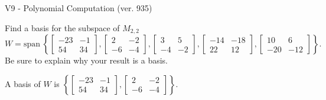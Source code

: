 \begin{exercise}
  \begin{exerciseTitle}V9 - Polynomial Computation (ver. 935)\end{exerciseTitle}
  \begin{exerciseStatement}
    Find a basis for the subspace of \(M_{2,2}\) 
\[W=\mathrm{span}\ \left\{\left[\begin{array}{cc}
-23 & -1 \\
54 & 34
\end{array}\right] , \left[\begin{array}{cc}
2 & -2 \\
-6 & -4
\end{array}\right] , \left[\begin{array}{cc}
3 & 5 \\
-4 & -2
\end{array}\right] , \left[\begin{array}{cc}
-14 & -18 \\
22 & 12
\end{array}\right] , \left[\begin{array}{cc}
10 & 6 \\
-20 & -12
\end{array}\right]\right\}.\]
 Be sure to explain why your result is a basis.


  \end{exerciseStatement}
  \begin{exerciseAnswer}
   A basis of \(W\) is  \(\left\{\left[\begin{array}{cc}
-23 & -1 \\
54 & 34
\end{array}\right] , \left[\begin{array}{cc}
2 & -2 \\
-6 & -4
\end{array}\right]\right\}\).
  


  \end{exerciseAnswer}
\end{exercise}